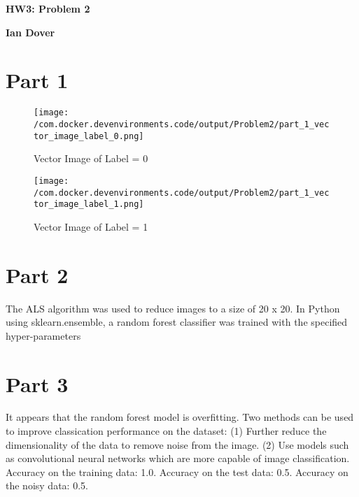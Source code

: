 \documentclass{article}%
\begin{document}
%
\normalsize%
\pagestyle{header}%
\begin{minipage}{\textwidth}%
\centering%
\begin{Large}%
\textbf{HW3: Problem 2}%
\end{Large}%
\linebreak%
\begin{large}%
\textbf{Ian Dover}%
\end{large}%
\end{minipage}%
\section{Part 1}%
\label{sec:Part1}%


\begin{figure}[h!]%
\centering%
\texttt{[image: /com.docker.devenvironments.code/output/Problem2/part\_1\_vector\_image\_label\_0.png]}%
\caption{Vector Image of Label = 0}%
\end{figure}

%


\begin{figure}[h!]%
\centering%
\texttt{[image: /com.docker.devenvironments.code/output/Problem2/part\_1\_vector\_image\_label\_1.png]}%
\caption{Vector Image of Label = 1}%
\end{figure}

%
\section{Part 2}%
\label{sec:Part2}%
The ALS algorithm was used to reduce images to a size of 20 x 20. In Python using sklearn.ensemble,\newline%
    a random forest classifier was trained with the specified hyper{-}parameters

%
\section{Part 3}%
\label{sec:Part3}%
It appears that the random forest model is overfitting.\newline%
        Two methods can be used to improve classication performance on the dataset:\newline%
        (1) Further reduce the dimensionality of the data to remove noise from the image.\newline%
        (2) Use models such as convolutional neural networks which are more capable of image classification.%
Accuracy on the training data: 1.0.\newline%
%
Accuracy on the test data: 0.5.\newline%
%
Accuracy on the noisy data: 0.5.\newline%

%
\end{document}
